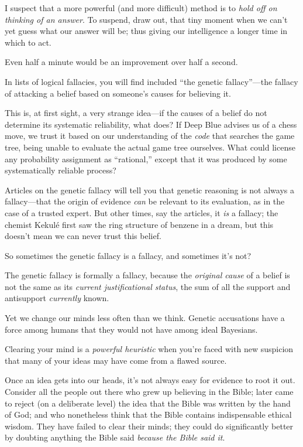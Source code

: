 {
 I suspect that a more powerful (and more difficult) method is to
\textit{hold off on thinking of an answer}. To suspend, draw out, that
tiny moment when we can't yet guess what our answer
will be; thus giving our intelligence a longer time in which to act.}

{
 Even half a minute would be an improvement over half a second.}

\myendsectiontext


\bigskip


{
 In lists of logical fallacies, you will find included
``the genetic fallacy''---the
fallacy of attacking a belief based on someone's causes
for believing it. }

{
 This is, at first sight, a very strange idea---if the causes of a
belief do not determine its systematic reliability, what does? If Deep
Blue advises us of a chess move, we trust it based on our understanding
of the \textit{code} that searches the game tree, being unable to
evaluate the actual game tree ourselves. What could license any
probability assignment as
``rational,'' except that it was
produced by some systematically reliable process?}

{
 Articles on the genetic fallacy will tell you that genetic
reasoning is not always a fallacy---that the origin of evidence
\textit{can} be relevant to its evaluation, as in the case of a trusted
expert. But other times, say the articles, it \textit{is} a fallacy;
the chemist Kekulé first saw the ring structure of benzene in a dream,
but this doesn't mean we can never trust this belief.}

{
 So sometimes the genetic fallacy is a fallacy, and sometimes
it's not?}

{
 The genetic fallacy is formally a fallacy, because the
\textit{original cause} of a belief is not the same as its
\textit{current justificational status}, the sum of all the support and
antisupport \textit{currently} known.}

{
 Yet we change our minds less often than we think. Genetic
accusations have a force among humans that they would not have among
ideal Bayesians.}

{
 Clearing your mind is a \textit{powerful heuristic} when
you're faced with new suspicion that many of your ideas
may have come from a flawed source.}

{
 Once an idea gets into our heads, it's not always
easy for evidence to root it out. Consider all the people out there who
grew up believing in the Bible; later came to reject (on a deliberate
level) the idea that the Bible was written by the hand of God; and who
nonetheless think that the Bible contains indispensable ethical wisdom.
They have failed to clear their minds; they could do significantly
better by doubting anything the Bible said \textit{because the Bible
said it}.}

